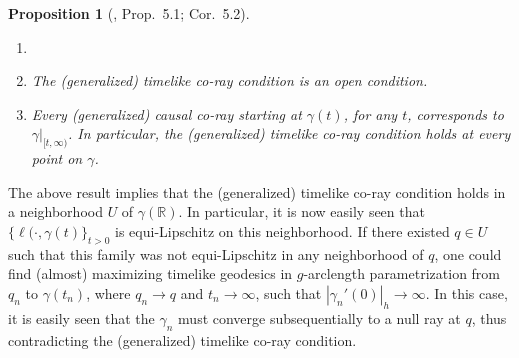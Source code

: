 \documentclass[a4paper,11pt]{article}
\numberwithin{equation}{section}
\theoremstyle{definition}
\theoremstyle{plain}
\newtheorem{Proposition}[Definition]{Proposition}
\newcommand{\R}{\mathbb R}
\begin{document}
\begin{Proposition}[\cite{GallowayHorta}, Prop.\ 5.1; Cor.\ 5.2]
    \begin{enumerate}
        \item[]
        \item The (generalized) timelike co-ray condition is an open condition.
        \item Every (generalized) causal co-ray starting at $\gamma(t)$, for any $t$, corresponds to $\gamma|_{[t,\infty)}$. In particular, the (generalized) timelike co-ray condition holds at every point on $\gamma$.
    \end{enumerate}
\end{Proposition}

The above result implies that the (generalized) timelike co-ray condition holds in a neighborhood $U$ of $\gamma(\R)$. In particular, it is now easily seen that $\{\ell(\cdot,\gamma(t)\}_{t > 0}$ is equi-Lipschitz on this neighborhood. If there existed $q \in U$ such that this family was not equi-Lipschitz in any neighborhood of $q$, one could find (almost) maximizing timelike geodesics in $g$-arclength parametrization from $q_n $ to $\gamma(t_n)$, where $q_n \to q$ and $t_n \to \infty$, such that $|\gamma_n'(0)|_h \to \infty$. In this case, it is easily seen that the $\gamma_n$ must converge subsequentially to a null ray at $q$, thus contradicting the (generalized) timelike co-ray condition.
\end{document}
